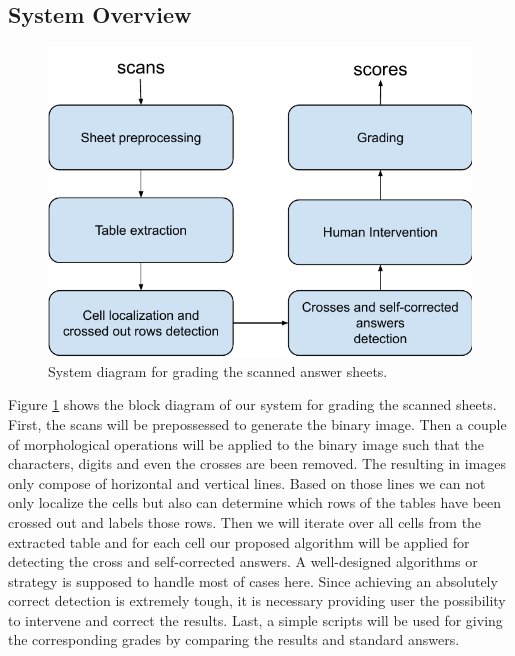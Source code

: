 \documentclass[a4paper,twoside]{article}
\begin{document}
\subsection{System Overview}
\begin{figure}[!h]
  \centering
  \includegraphics[width=\columnwidth]{Latex/imgs/SystemOverview.pdf}
  \caption{System diagram for grading the scanned answer sheets.}
  \label{fig:System_diagram}
 \end{figure}
Figure \ref{fig:System_diagram} shows the block diagram of our system for grading the scanned sheets. First, the scans will be prepossessed to generate the binary image. Then a couple of morphological operations will be applied to the binary image such that the characters, digits and even the crosses are been removed. The resulting in images only compose of horizontal and vertical lines. Based on those lines we can not only localize the cells but also can determine which rows of the tables have been crossed out and labels those rows. Then we will iterate over all cells from the extracted table and for each cell our proposed algorithm will be applied for detecting the cross and self-corrected answers. A well-designed algorithms or strategy is supposed to handle most of cases here. Since achieving an absolutely correct detection is extremely tough, it is necessary providing user the possibility to intervene and correct the results. Last, a simple scripts will be used for giving the corresponding grades by comparing the results and standard answers.   
 
 
\end{document}
